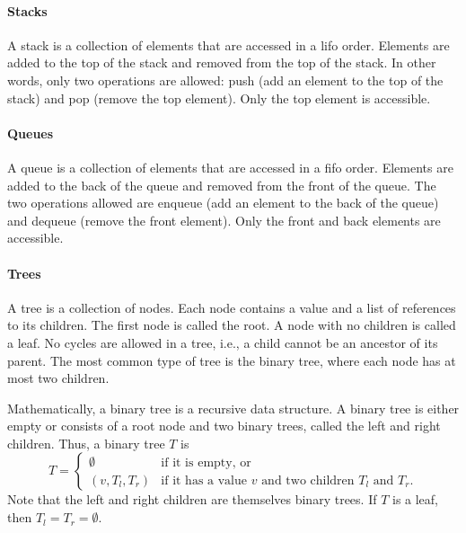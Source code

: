 
\paragraph{Stacks}  A stack is a collection of elements that are accessed in a
\gls{lifo} order.  Elements are added to the top of the stack and
removed from the top of the stack.  In other words, only two operations are
allowed: push (add an element to the top of the stack) and pop (remove the top element).
Only the top element is accessible.

\paragraph{Queues}  A queue is a collection of elements that are accessed in a
\gls{fifo} order.  Elements are added to the back of the queue and
removed from the front of the queue.  The two operations allowed are enqueue (add an
element to the back of the queue) and dequeue (remove the front element).  Only the
front and back elements are accessible.

\paragraph{Trees}  A tree is a collection of nodes.  Each node contains a value and a list
of references to its children.  The first node is called the root.  A node with no
children is called a leaf.  No cycles are allowed in a tree, i.e., a child cannot be an
ancestor of its parent. The most common type of tree is the binary tree, where each node
has at most two children.

Mathematically, a binary tree is a recursive data structure.  A binary tree is either
empty or consists of a root node and two binary trees, called the left and right
children.   Thus, a binary tree $T$ is
\[
  T = \begin{cases}
    \emptyset & \text{if it is empty, or} \\
    \left(v, T_l, T_r\right) & \text{if it has a value $v$ and two children $T_l$ and $T_r$.}
  \end{cases}
\]
Note that the left and right children are themselves binary trees.  If $T$ is a leaf,
then $T_l = T_r = \emptyset$.

